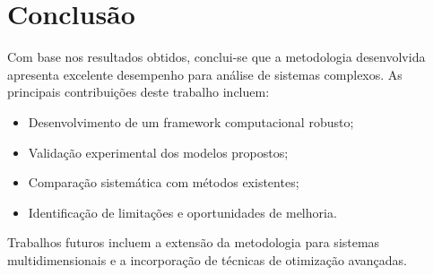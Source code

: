 \section{Conclusão}

\lipsum[18] Com base nos resultados obtidos, conclui-se que a metodologia desenvolvida apresenta excelente desempenho para análise de sistemas complexos. As principais contribuições deste trabalho incluem:

\begin{itemize}
    \item Desenvolvimento de um framework computacional robusto;
    \item Validação experimental dos modelos propostos;
    \item Comparação sistemática com métodos existentes;
    \item Identificação de limitações e oportunidades de melhoria.
\end{itemize}

Trabalhos futuros incluem a extensão da metodologia para sistemas multidimensionais e a incorporação de técnicas de otimização avançadas.
